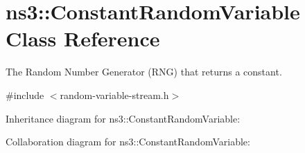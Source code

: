 \hypertarget{classns3_1_1ConstantRandomVariable}{}\section{ns3\+:\+:Constant\+Random\+Variable Class Reference}
\label{classns3_1_1ConstantRandomVariable}


The Random Number Generator (R\+NG) that returns a constant.  




{\ttfamily \#include $<$random-\/variable-\/stream.\+h$>$}



Inheritance diagram for ns3\+:\+:Constant\+Random\+Variable\+:


Collaboration diagram for ns3\+:\+:Constant\+Random\+Variable\+:
